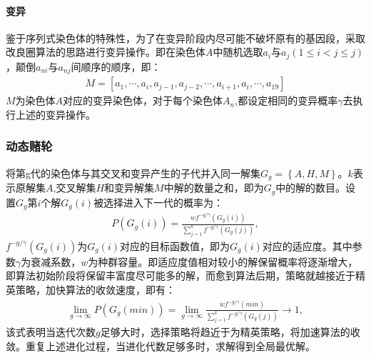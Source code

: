\documentclass{whutmod}
\begin{document}
    	
         \paragraph{变异}
         鉴于序列式染色体的特殊性，为了在变异阶段内尽可能不破坏原有的基因段，采取改良圈算法的思路进行变异操作。即在染色体$A$中随机选取$a_{i}$与$a_{j}(1\leqslant i<j\leqslant j )$，颠倒$a_{ni}$与$a_{nj}$间顺序的顺序，即：
          \begin{gather}
          M=[a_{1},\cdots,a_{i},a_{j-1},a_{j-2},\cdots,a_{i+1},a_{i},\cdots,a_{19}]
          \end{gather}
          $M$为染色体$A$对应的变异染色体，对于每个染色体$A_n$,都设定相同的变异概率$\gamma$去执行上述的变异操作。 
         \subsubsection{动态赌轮}
         将第g代的染色体与其交叉和变异产生的子代并入同一解集$G_g=\left \{A,H,M\right \}$。$k$表示原解集$A$,交叉解集$H$和变异解集$M$中解的数量之和，即为$G_g$中的解的数目。设置$G_g$第$i$个解$G_g(i)$被选择进入下一代的概率为：
         \begin{gather}
          P(G_{g}(i))=\frac{wf^{-g/\gamma }(G_{g}(i))}{\sum_{j=1}^{k}f^{-g/\gamma }(G_{g}(j))},
         \end{gather}
         $f^{-g/\gamma }(G_{g}(i))$为$G_{g}(i)$对应的目标函数值，即为$G_{g}(i)$对应的适应度。其中参数$\gamma$为衰减系数，$w$为种群容量。即适应度值相对较小的解保留概率将逐渐增大，
         即算法初始阶段将保留丰富度尽可能多的解，而愈到算法后期，策略就越接近于精英策略，加快算法的收敛速度，即有：
           \begin{gather}
           \lim_{g\rightarrow \infty } P(G_{g}(min))=\lim_{g\rightarrow \infty }\frac{wf^{-g/\gamma }(min)}{\sum_{j=1}^{k}f^{-g/\gamma }(G_{g}(j))}\rightarrow 1 ,
         \end{gather}
         该式表明当迭代次数$g$足够大时，选择策略将趋近于为精英策略，将加速算法的收敛。重复上述进化过程，当进化代数足够多时，求解得到全局最优解。
         
         
\end{document}
